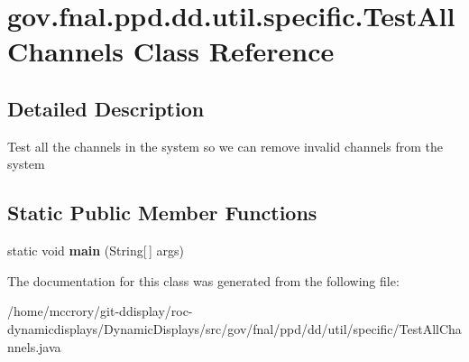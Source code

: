 \hypertarget{classgov_1_1fnal_1_1ppd_1_1dd_1_1util_1_1specific_1_1TestAllChannels}{\section{gov.\-fnal.\-ppd.\-dd.\-util.\-specific.\-Test\-All\-Channels Class Reference}
\label{classgov_1_1fnal_1_1ppd_1_1dd_1_1util_1_1specific_1_1TestAllChannels}
}


\subsection{Detailed Description}
Test all the channels in the system so we can remove invalid channels from the system \subsection*{Static Public Member Functions}
\begin{DoxyCompactItemize}
\item 
\hypertarget{classgov_1_1fnal_1_1ppd_1_1dd_1_1util_1_1specific_1_1TestAllChannels_a425fb3591c64046af21e8530efcb40dd}{static void {\bfseries main} (String\mbox{[}$\,$\mbox{]} args)}\label{classgov_1_1fnal_1_1ppd_1_1dd_1_1util_1_1specific_1_1TestAllChannels_a425fb3591c64046af21e8530efcb40dd}

\end{DoxyCompactItemize}


The documentation for this class was generated from the following file\-:\begin{DoxyCompactItemize}
\item 
/home/mccrory/git-\/ddisplay/roc-\/dynamicdisplays/\-Dynamic\-Displays/src/gov/fnal/ppd/dd/util/specific/Test\-All\-Channels.\-java\end{DoxyCompactItemize}
